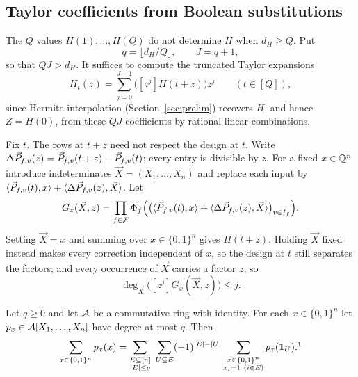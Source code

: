 \subsection{Taylor coefficients from Boolean substitutions}
The $Q$ values $H(1),\dots,H(Q)$ do not determine $H$ when $d_H\ge Q$. Put
\begin{equation}\label{eq:qJ}
  q=\lfloor d_H/Q\rfloor,\qquad J=q+1 ,
\end{equation}
so that $QJ>d_H$. It suffices to compute the truncated Taylor expansions
\begin{equation}\label{eq:Ht}
  H_t(z)=\sum_{j=0}^{J-1}\bigl([z^j]H(t+z)\bigr)z^j\qquad(t\in[Q]),
\end{equation}
since Hermite interpolation (Section~\ref{sec:prelim}) recovers $H$, and hence
$Z=H(0)$, from these $QJ$ coefficients by rational linear combinations.

Fix $t$. The rows at $t+z$ need not respect the design at $t$. Write
$\Delta\vec{P}_{f,v}(z)=\vec{P}_{f,v}(t+z)-\vec{P}_{f,v}(t)$; every entry is divisible by
$z$. For a fixed $x\in\mathbb{Q}^n$ introduce indeterminates $\vec X=(X_1,\dots,X_n)$ and
replace each input by $\langle \vec{P}_{f,v}(t),x\rangle+\langle \Delta\vec{P}_{f,v}(z),\vec X\rangle$. Let
\begin{equation}\label{eq:Gx}
  G_x(\vec X,z)=\prod_{f\in\mathcal{F}}\Phi_f\Bigl(\bigl(\langle \vec{P}_{f,v}(t),x\rangle+\langle \Delta\vec{P}_{f,v}(z),\vec X\rangle\bigr)_{v\in I_f}\Bigr).
\end{equation}
Setting $\vec X=x$ and summing over $x\in\{0,1\}^n$ gives $H(t+z)$. Holding
$\vec X$ fixed instead makes every correction independent of $x$, so the design at
$t$ still separates the factors; and every occurrence of $\vec X$ carries a factor
$z$, so
\begin{equation}\label{eq:degX}
  \deg_{\vec X}\bigl([z^j]G_x(\vec X,z)\bigr)\le j .
\end{equation}

\begin{lemma}\label{lem:moebius}
Let $q\ge0$ and let $\mathcal{A}$ be a commutative ring with identity. For each
$x\in\{0,1\}^n$ let $p_x\in\mathcal{A}[X_1,\dots,X_n]$ have degree at most $q$. Then
\begin{equation}\label{eq:moebius}
  \sum_{x\in\{0,1\}^n}p_x(x)=\sum_{\substack{E\subseteq[n]\\|E|\le q}}\ \sum_{U\subseteq E}(-1)^{|E|-|U|}
  \sum_{\substack{x\in\{0,1\}^n\\ x_i=1\ (i\in E)}}p_x(\mathbf 1_U).\footnotemark
\end{equation}
\end{lemma}

